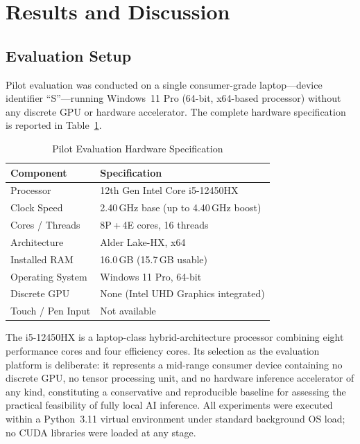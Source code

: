 \documentclass[12pt, letterpaper]{article}
\begin{document}
\section{Results and Discussion}

\subsection{Evaluation Setup}

Pilot evaluation was conducted on a single consumer-grade
laptop---device identifier ``S''---running Windows~11 Pro
(64-bit, x64-based processor) without any discrete GPU or
hardware accelerator.
The complete hardware specification is reported in
Table~\ref{tab:hardware}.

\begin{table}[htbp]
\centering
\caption{Pilot Evaluation Hardware Specification}
\label{tab:hardware}
\begin{tabular}{ll}
\toprule
\textbf{Component}     & \textbf{Specification} \\
\midrule
Processor              & 12th Gen Intel Core i5-12450HX \\
Clock Speed            & 2.40\,GHz base (up to 4.40\,GHz boost) \\
Cores / Threads        & 8P\,+\,4E cores, 16 threads \\
Architecture           & Alder Lake-HX, x64 \\
Installed RAM          & 16.0\,GB (15.7\,GB usable) \\
Operating System       & Windows 11 Pro, 64-bit \\
Discrete GPU           & None (Intel UHD Graphics integrated) \\
Touch / Pen Input      & Not available \\
\bottomrule
\end{tabular}
\end{table}

The i5-12450HX is a laptop-class hybrid-architecture
processor combining eight performance cores and four
efficiency cores.
Its selection as the evaluation platform is deliberate: it
represents a mid-range consumer device containing no discrete
GPU, no tensor processing unit, and no hardware inference
accelerator of any kind, constituting a conservative and
reproducible baseline for assessing the practical feasibility
of fully local AI inference.
All experiments were executed within a Python~3.11 virtual
environment under standard background OS load; no CUDA
libraries were loaded at any stage.
\end{document}

